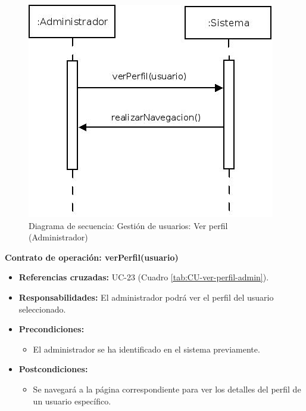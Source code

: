 \begin{figure}[H]
\centering
  \includegraphics[scale=.55]{img/secuencias/gestion-usuarios-ver-perfil.jpeg}
  \caption{Diagrama de secuencia: Gestión de usuarios: Ver perfil (Administrador)}
  \label{fig:secuencia-gestion-usuarios-ver-perfil}
\end{figure}

\textbf{Contrato de operación: verPerfil(usuario)}
\begin{itemize}
\item \textbf{Referencias cruzadas:} UC-23 (Cuadro \ref{tab:CU-ver-perfil-admin}).
\item \textbf{Responsabilidades:} El administrador podrá ver el perfil del usuario seleccionado.
\item \textbf{Precondiciones:} 
 \begin{itemize}
\item El administrador se ha identificado en el sistema previamente.
\end {itemize}
\item \textbf{Postcondiciones:} 
 \begin{itemize}
\item Se navegará a la página correspondiente para ver los detalles del perfil de un usuario específico.
\end {itemize}
\end {itemize}

